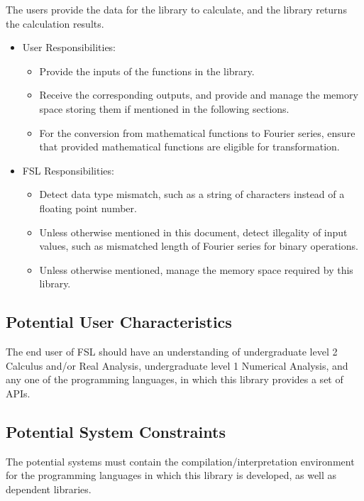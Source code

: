 \documentclass[12pt]{article}
\newcommand{\famname}{FSL} %
\begin{document}
The users provide the data for the library to  calculate, and the library returns the calculation results.
\begin{itemize}
\item User Responsibilities:
\begin{itemize}
\item Provide the inputs of the functions in the library.
\item Receive the corresponding outputs, and provide and manage the memory space storing them if mentioned in the following sections.
\item For the conversion from mathematical functions to Fourier series, ensure that provided mathematical functions are eligible for transformation. 

\end{itemize}
\item \famname{} Responsibilities:
\begin{itemize}
\item Detect data type mismatch, such as a string of characters instead of a
  floating point number.
\item Unless otherwise mentioned in this document, detect illegality of input values, such as mismatched length of Fourier series for binary operations.
\item Unless otherwise mentioned, manage the memory space required by this library.
\end{itemize}
\end{itemize}

\subsection{Potential User Characteristics} \label{SecUserCharacteristics}

The end user of \famname{} should have an understanding of undergraduate level 2 Calculus and/or Real Analysis, undergraduate level 1 Numerical Analysis, and any one of the programming languages, in which this library provides a set of APIs.

\subsection{Potential System Constraints}
The potential systems must contain the compilation/interpretation environment for the programming languages in which this library is developed, as well as dependent libraries.
\end{document}
